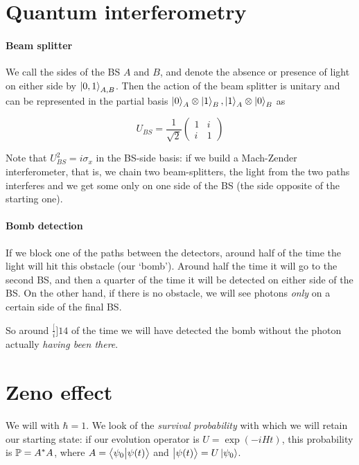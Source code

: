 \documentclass[main.tex]{subfiles}
\begin{document}
\section{Quantum interferometry}

\paragraph{Beam splitter}

We call the sides of the BS \(A\) and \(B\), and denote the absence or presence of light on either side by \(\ket{0,1} _{A, B}\). Then the action of the beam splitter is unitary and can be represented in the partial basis \(\ket{0}_A \otimes \ket{1} _B , \ket{1}_A \otimes \ket{0} _B\) as

\begin{equation}
    U_{BS} = \frac{1}{\sqrt{2} }
    \begin{pmatrix}
    1   & i \\
    i   & 1
    \end{pmatrix}
\end{equation}

Note that \(U_{BS}^2 = i\sigma_x\) in the BS-side basis: if we build a Mach-Zender interferometer, that is, we chain two beam-splitters, the light from the two paths interferes and we get some only on one side of the BS (the side opposite of the starting one).

\paragraph{Bomb detection}

If we block one of the paths between the detectors, around half of the time the light will hit this obstacle (our `bomb'). Around half the time it will go to the second BS, and then a quarter of the time it will be detected on either side of the BS. On the other hand, if there is no obstacle, we will see photons \emph{only} on a certain side of the final BS.

So around \(\frac[i]{1}{4} \) of the time we will have detected the bomb without the photon actually \emph{having been there}.

\section{Zeno effect}

We will with \(\hbar=1\).
We look of the \emph{survival probability} with which we will retain our starting state: if our evolution operator is \(U = \exp(-iHt) \), this probability is \(\P = A^*A\), where \(A = \braket{\psi_0}{\psi (t)} \) and \(\ket{\psi (t)} = U \ket{\psi _0} \).
\end{document}
